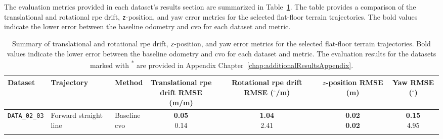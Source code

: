 \documentclass[report.tex]{subfiles}
\begin{document}
    The evaluation metrics provided in each dataset's results section are summarized in Table~\ref{tab:flat_floor_metric_summary}. The table provides a comparison of the translational and rotational \gls{rpe} drift, \texttt{z}-position, and yaw error metrics for the selected flat-floor terrain trajectories. The bold values indicate the lower error between the baseline odometry and \gls{cvo} for each dataset and metric.
    
    \begin{table}[!htbp]
        \centering
        \caption[Summary of flat-floor terrain metrics]{Summary of translational and rotational \gls{rpe} drift, 
        \texttt{z}-position, and yaw error metrics for the selected flat-floor 
        terrain trajectories. Bold values indicate the lower error between the 
        baseline odometry and \gls{cvo} for each dataset and metric. The evaluation results for the datasets marked with \textsuperscript{*} are provided in Appendix Chapter~\ref{chap:additionalResultsAppendix}.}
        \label{tab:flat_floor_metric_summary}

        \scriptsize
        \setlength{\tabcolsep}{3.5pt}
        \renewcommand{\arraystretch}{1.12}
        \renewcommand{\tabularxcolumn}[1]{m{#1}}

        \begin{tabularx}{\textwidth}{
            >{\raggedright\arraybackslash}m{1.55cm}
            >{\raggedright\arraybackslash}X
            l
            cccc
        }
            \toprule
            Dataset &
            Trajectory &
            Method &
            \makecell{Translational \gls{rpe}\\drift RMSE (m/m)} &
            \makecell{Rotational \gls{rpe}\\drift RMSE ($^\circ$/m)} &
            \makecell{$z$-position\\RMSE (m)} &
            \makecell{Yaw\\RMSE ($^\circ$)} \\
            \midrule

            \texttt{DATA\_02\_03}
            & Forward straight line
            & \makecell[l]{Baseline\\\gls{cvo}}
            & \makecell{\textbf{0.05}\\0.14}
            & \makecell{\textbf{1.04}\\2.41}
            & \makecell{\textbf{0.02}\\\textbf{0.02}}
            & \makecell{\textbf{0.15}\\4.95} \\
            \addlinespace


\end{tabularx}
\end{table}
\end{document}
